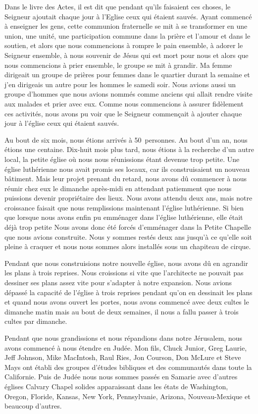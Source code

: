 Dans le livre des Actes, il est dit que pendant qu'ils faisaient ces choses, le Seigneur ajoutait chaque jour à l’Eglise
ceux qui étaient sauvés. Ayant commencé à enseigner les gens, cette communion fraternelle se mit à se transformer
en une union, une unité, une participation commune dans la prière et l’amour et dans le soutien, et alors que nous
commencions à rompre le pain ensemble, à adorer le Seigneur ensemble, à nous souvenir de Jésus qui est mort pour
nous et alors que nous commencions à prier ensemble, le groupe se mit à grandir. Ma femme dirigeait un groupe de
prières pour femmes dans le quartier durant la semaine et j’en dirigeais un autre pour les hommes le samedi soir.
Nous avions aussi un groupe d’hommes que nous avions nommés comme anciens qui allait rendre visite aux malades
et prier avec eux. Comme nous commencions à assurer fidèlement ces activités, nous avons pu voir que le Seigneur
commençait à ajouter chaque jour à l’église ceux qui étaient sauvés.

Au bout de six mois, nous étions arrivés à 50~personnes. Au bout d’un an, nous étions une centaine. Dix-huit mois
plus tard, nous étions à la recherche d’un autre local, la petite église où nous nous réunissions étant devenue trop
petite. Une église luthérienne nous avait promis ses locaux, car ils construisaient un nouveau bâtiment. Mais leur
projet prenant du retard, nous avons dû commencer à nous réunir chez eux le dimanche après-midi en attendant
patiemment que nous puissions devenir propriétaire des lieux. Nous avons attendu deux ans, mais notre croissance
faisait que nous remplissions maintenant l'église luthérienne. Si bien que lorsque nous avons enfin pu emménager
dans l'église luthérienne, elle était déjà trop petite Nous avons donc été forcés d'emménager dans la \og Petite Chapelle\fg{}
que nous avions construite. Nous y sommes restés deux ans jusqu’à ce qu'elle soit pleine à craquer et nous nous
sommes alors installés sous un chapiteau de cirque.

Pendant que nous construisions notre nouvelle église, nous avons dû en agrandir les plans à trois reprises. Nous
croissions si vite que l’architecte ne pouvait pas dessiner ses plans assez vite pour s'adapter à notre expansion. Nous
avions dépassé la capacité de l’église à trois reprises pendant qu’on en dessinait les plans et quand nous avons ouvert
les portes, nous avons commencé avec deux cultes le dimanche matin mais au bout de deux semaines, il nous a fallu
passer à trois cultes par dimanche.

Pendant que nous grandissions et nous répandions dans notre Jérusalem, nous avons commencé à nous étendre en
Judée. Mon fils, Chuck Junior, Greg Laurie, Jeff Johnson, Mike MacIntosh, Raul Ries, Jon Courson, Don McLure et
Steve Mays ont établi des groupes d’études bibliques et des communautés dans toute la Californie. Puis de Judée
nous nous sommes passés en Samarie avec d’autres églises Calvary Chapel solides apparaissant dans les états de
Washington, Oregon, Floride, Kansas, New York, Pennsylvanie, Arizona, Nouveau-Mexique et beaucoup d’autres.

